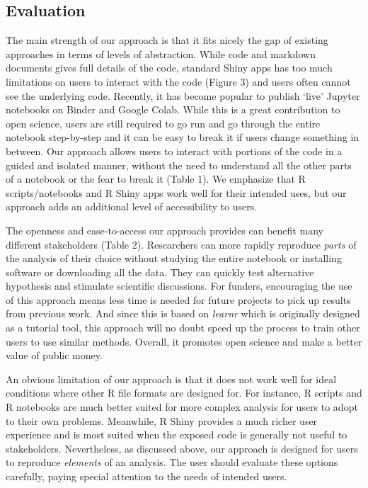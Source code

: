 \hypertarget{evaluation}{%
\subsection{Evaluation}\label{evaluation}}

The main strength of our approach is that it fits nicely the gap of
existing approaches in terms of levels of abstraction. While code and
markdown documents gives full details of the code, standard Shiny apps
has too much limitations on users to interact with the code (Figure 3)
and users often cannot see the underlying code. Recently, it has become
popular to publish `live' Jupyter notebooks on Binder and Google Colab.
While this is a great contribution to open science, users are still
required to go run and go through the entire notebook step-by-step and
it can be easy to break it if users change something in between. Our
approach allows users to interact with portions of the code in a guided
and isolated manner, without the need to understand all the other parts
of a notebook or the fear to break it (Table 1). We emphasize that R
scripts/notebooks and R Shiny apps work well for their intended uses,
but our approach adds an additional level of accessibility to users.

The openness and ease-to-access our approach provides can benefit many
different stakeholders (Table 2). Researchers can more rapidly reproduce
\emph{parts} of the analysis of their choice without studying the entire
notebook or installing software or downloading all the data. They can
quickly test alternative hypothesis and stimulate scientific
discussions. For funders, encouraging the use of this approach means
less time is needed for future projects to pick up results from previous
work. And since this is based on \emph{learnr} which is originally
designed as a tutorial tool, this approach will no doubt speed up the
process to train other users to use similar methods. Overall, it
promotes open science and make a better value of public money.

An obvious limitation of our approach is that it does not work well for
ideal conditions where other R file formats are designed for. For
instance, R scripts and R notebooks are much better suited for more
complex analysis for users to adopt to their own problems. Meanwhile, R
Shiny provides a much richer user experience and is most suited when the
exposed code is generally not useful to stakeholders. Nevertheless, as
discussed above, our approach is designed for users to reproduce
\emph{elements} of an analysis. The user should evaluate these options
carefully, paying special attention to the needs of intended users.

